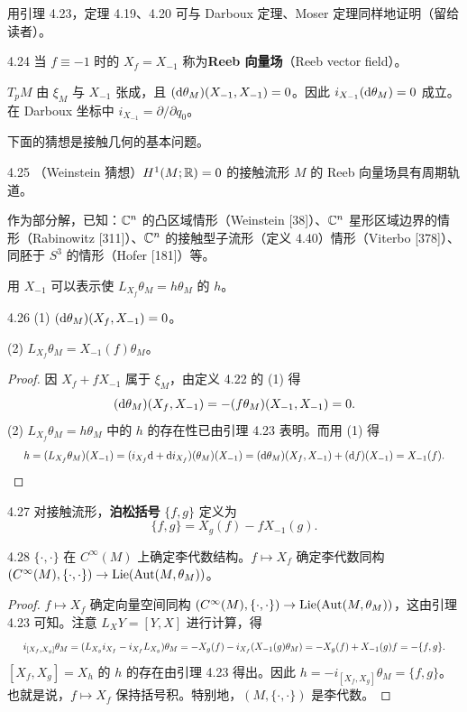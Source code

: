 用引理 4.23，定理 4.19、4.20 可与 Darboux 定理、Moser 定理同样地证明（留给读者）。

\begin{definition}{4.24}
  当 $f\equiv-1$ 时的 $X_f=X_{-1}$ 称为\textbf{Reeb 向量场}（Reeb vector field）。
\end{definition}

$T_pM$ 由 $\xi_M$ 与 $X_{-1}$ 张成，且 $(\mathrm{d}\theta_M)(X_{-1},X_{-1})=0$。因此 $i_{X_{-1}}(\mathrm{d}\theta_M)=0$ 成立。在 Darboux 坐标中 $i_{X_{-1}}=\partial/\partial q_0$。

下面的猜想是接触几何的基本问题。

\begin{conjecture}{4.25}
  （Weinstein 猜想）$H^1(M;\mathbb{R})=0$ 的接触流形 $M$ 的 Reeb 向量场具有周期轨道。
\end{conjecture}

作为部分解，已知：$\mathbb{C}^n$ 的凸区域情形（Weinstein [38]）、$\mathbb{C}^n$ 星形区域边界的情形（Rabinowitz [311]）、$\mathbb{C}^n$ 的接触型子流形（定义 4.40）情形（Viterbo [378]）、同胚于 $S^3$ 的情形（Hofer [181]）等。

用 $X_{-1}$ 可以表示使 $L_{X_f}\theta_M=h\theta_M$ 的 $h$。

\begin{lemma*}{4.26}
  (1) $(\mathrm{d}\theta_M)(X_f,X_{-1})=0$。

  (2) $L_{X_f}\theta_M=X_{-1}(f)\theta_M$。
\end{lemma*}
\begin{proof}
  因 $X_f+fX_{-1}$ 属于 $\xi_M$，由定义 4.22 的 (1) 得
  \[
    (\mathrm{d}\theta_M)(X_f,X_{-1})=-(f\theta_M)(X_{-1},X_{-1})=0.
  \]
  (2) $L_{X_f}\theta_M=h\theta_M$ 中的 $h$ 的存在性已由引理 4.23 表明。而用 (1) 得
\[
  \resizebox{0.97\linewidth}{!}{$\displaystyle h=(L_{X_f}\theta_M)(X_{-1})=(i_{X_f}\rd+\rd i_{X_f})(\theta_M)(X_{-1})=(\rd\theta_M)(X_f,X_{-1})+(\rd f)(X_{-1})=X_{-1}(f). $}
\]
\end{proof}

\begin{definition}{4.27}
  对接触流形，\textbf{泊松括号} $\{f,g\}$ 定义为
  \[
    \{f,g\}=X_g(f)-fX_{-1}(g).
  \]
\end{definition}

\begin{theorem*}{4.28}
  $\{\cdot,\cdot\}$ 在 $C^\infty(M)$ 上确定李代数结构。$f\mapsto X_f$ 确定李代数同构 $(C^\infty(M),\{\cdot,\cdot\})\to\mathrm{Lie}(\operatorname{Aut}(M,\theta_M))$。
\end{theorem*}
\begin{proof}
  $f\mapsto X_f$ 确定向量空间同构 $(C^\infty(M),\{\cdot,\cdot\})\to\mathrm{Lie}(\operatorname{Aut}(M,\theta_M))$，这由引理 4.23 可知。注意 $L_XY=[Y,X]$ 进行计算，得
\[
  \resizebox{0.97\linewidth}{!}{$\displaystyle i_{[X_f,X_g]}\theta_M=(L_{X_g}i_{X_f}-i_{X_f}L_{X_g})\theta_M=-X_g(f)-i_{X_f}(X_{-1}(g)\theta_M)=-X_g(f)+X_{-1}(g)f=-\{f,g\}. $}
\]
  $[X_f,X_g]=X_h$ 的 $h$ 的存在由引理 4.23 得出。因此 $h=-i_{[X_f,X_g]}\theta_M=\{f,g\}$。也就是说，$f\mapsto X_f$ 保持括号积。特别地，$(M,\{\cdot,\cdot\})$ 是李代数。
\end{proof}

